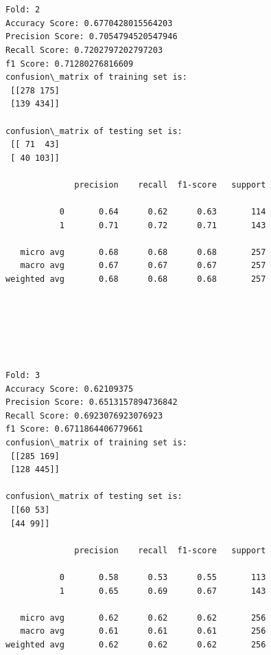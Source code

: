 \documentclass[11pt]{article}
\begin{document}
    \begin{center}
    \end{center}
    { \hspace*{\fill} \\}
    
    \begin{Verbatim}[commandchars=\\\{\}]

Fold: 2
Accuracy Score: 0.6770428015564203
Precision Score: 0.7054794520547946
Recall Score: 0.7202797202797203
f1 Score: 0.71280276816609
confusion\_matrix of training set is: 
 [[278 175]
 [139 434]] 

confusion\_matrix of testing set is: 
 [[ 71  43]
 [ 40 103]] 

              precision    recall  f1-score   support

           0       0.64      0.62      0.63       114
           1       0.71      0.72      0.71       143

   micro avg       0.68      0.68      0.68       257
   macro avg       0.67      0.67      0.67       257
weighted avg       0.68      0.68      0.68       257


    \end{Verbatim}

    \begin{center}
    \end{center}
    { \hspace*{\fill} \\}
    
    \begin{center}
    \end{center}
    { \hspace*{\fill} \\}
    
    \begin{Verbatim}[commandchars=\\\{\}]

Fold: 3
Accuracy Score: 0.62109375
Precision Score: 0.6513157894736842
Recall Score: 0.6923076923076923
f1 Score: 0.6711864406779661
confusion\_matrix of training set is: 
 [[285 169]
 [128 445]] 

confusion\_matrix of testing set is: 
 [[60 53]
 [44 99]] 

              precision    recall  f1-score   support

           0       0.58      0.53      0.55       113
           1       0.65      0.69      0.67       143

   micro avg       0.62      0.62      0.62       256
   macro avg       0.61      0.61      0.61       256
weighted avg       0.62      0.62      0.62       256


    \end{Verbatim}
\end{document}
